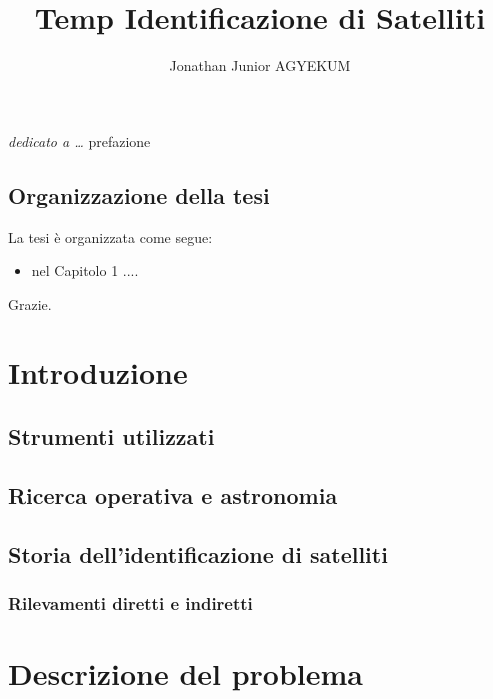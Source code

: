 \documentclass[a4paper,12pt]{report}
\begin{document}
\title{Temp Identificazione di Satelliti}
\author{Jonathan Junior AGYEKUM}
%
%
%
\beforepreface
\prefacesection{}
        {\hfill \Large {\sl dedicato a \dots}}
%
%
prefazione
%
%
\section*{Organizzazione della tesi}
\label{organizzazione}
La tesi \`e organizzata come segue:
\begin{itemize}
\item nel Capitolo 1 ....
\end{itemize}
%
%
Grazie.
\afterpreface
%
%
\chapter{Introduzione}
\label{cap1}
\section{Strumenti utilizzati}
\section{Ricerca operativa e astronomia}
\section{Storia dell'identificazione di satelliti}
\subsection{Rilevamenti diretti e indiretti}

%
%
\chapter{Descrizione del problema}
\label{cap2}
\end{document}
